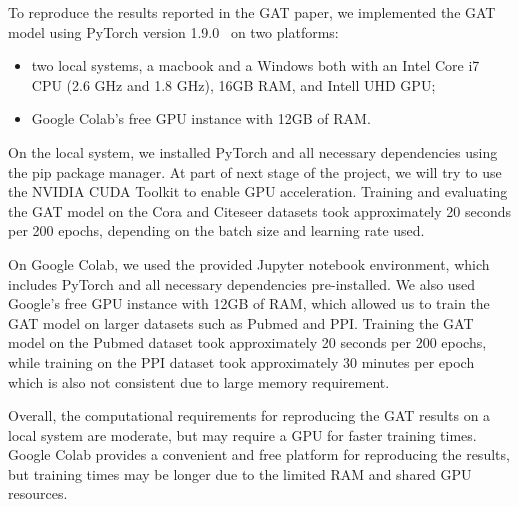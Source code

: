 To reproduce the results reported in the GAT paper, we implemented the GAT model using PyTorch version 1.9.0~\cite{paszke2019pytorch} on two platforms:
\begin{itemize}
    \item two local systems, a macbook and a Windows both with an Intel Core i7 CPU (2.6 GHz and 1.8 GHz), 16GB RAM,
    and Intell UHD GPU;
    \item Google Colab's free GPU instance with 12GB of RAM\@.
\end{itemize}

On the local system, we installed PyTorch and all necessary dependencies using the pip package manager.
At part of next stage of the project, we will try to use the NVIDIA CUDA Toolkit to enable GPU acceleration.
Training and evaluating the GAT model on the Cora and Citeseer datasets took approximately 20 seconds per 200
epochs, depending on the batch size and learning rate used.

On Google Colab, we used the provided Jupyter notebook environment, which includes PyTorch and all necessary dependencies pre-installed.
We also used Google's free GPU instance with 12GB of RAM, which allowed us to train the GAT model on larger datasets such as Pubmed and PPI.
Training the GAT model on the Pubmed dataset took approximately 20 seconds per 200 epochs, while training on the PPI
dataset took approximately 30 minutes per epoch which is also not consistent due to large memory requirement.

Overall, the computational requirements for reproducing the GAT results on a local system are moderate, but may require a GPU for faster training times.
Google Colab provides a convenient and free platform for reproducing the results, but training times may be longer due to the limited RAM and shared GPU resources.
